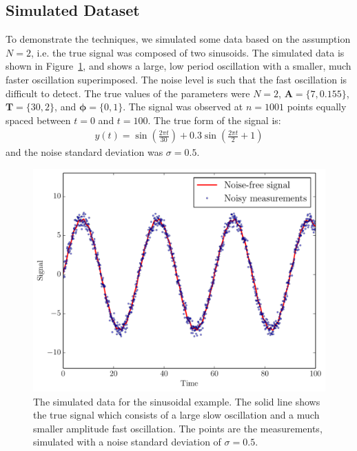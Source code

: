 \documentclass[letterpaper, 11pt]{article}
\begin{document}
\subsection{Simulated Dataset}
To demonstrate the techniques,
we simulated some data based on the assumption $N=2$, i.e. the true signal was
composed of two sinusoids.
The simulated data is shown in Figure~\ref{fig:sinewave_data}, and shows a
large, low period oscillation with a smaller, much faster oscillation
superimposed. The noise level is such that the fast oscillation is difficult
to detect. The true values of the parameters were
$N=2$, $\mathbf{A} = \{7, 0.155\}$,
$\mathbf{T}=\{30, 2\}$, and $\boldsymbol{\phi} = \{0, 1\}$. The signal was
observed at $n=1001$ points equally spaced between $t=0$ and $t=100$.
The true form of the signal is:
\begin{eqnarray}
y(t) = \sin\left(\frac{2\pi t}{30}\right) +
0.3 \sin\left(\frac{2\pi t}{2} + 1\right)
\end{eqnarray}
and the noise standard deviation was $\sigma = 0.5$.

\begin{figure}
\begin{center}
\includegraphics[scale=0.5]{sinewave_data.pdf}
\caption{The simulated data for the sinusoidal example. The solid line shows
the true signal which consists of a large slow oscillation and a much smaller
amplitude fast oscillation. The points are the measurements, simulated with a
noise standard deviation of $\sigma = 0.5$.
\label{fig:sinewave_data}}
\end{center}
\end{figure}
\end{document}
